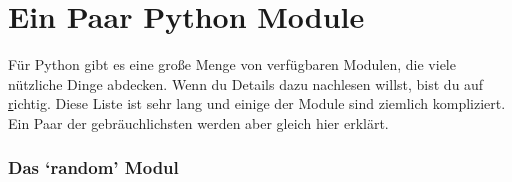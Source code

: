

\chapter{Ein Paar Python Module}\label{app:afewpythonmodules}

Für Python gibt es eine große Menge von verfügbaren Modulen, die viele nützliche Dinge abdecken. Wenn du Details dazu nachlesen willst, bist du auf \href{http://docs.python.org/3.1/modindex.html} richtig. Diese Liste ist sehr lang und einige der Module sind ziemlich kompliziert. Ein Paar der gebräuchlichsten werden aber gleich hier erklärt. 

\subsection*{Das `random' Modul}

